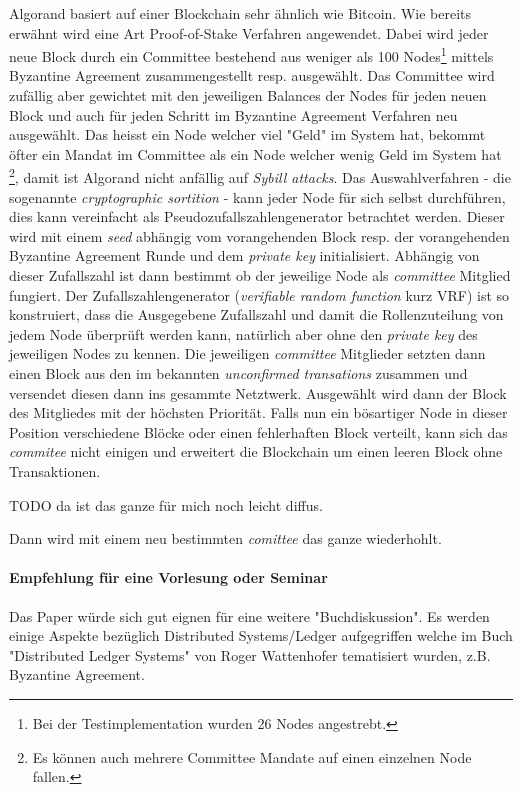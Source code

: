 \documentclass[11pt,a4paper]{article}
\begin{document}
Algorand basiert auf einer Blockchain sehr ähnlich wie Bitcoin.
Wie bereits erw\"ahnt wird eine Art Proof-of-Stake Verfahren angewendet.
Dabei wird jeder neue Block durch ein Committee bestehend aus weniger als 100 Nodes\footnote{Bei der Testimplementation wurden 26 Nodes angestrebt.} mittels Byzantine Agreement zusammengestellt resp. ausgewählt.
Das Committee wird zufällig aber gewichtet mit den jeweiligen Balances der Nodes für jeden neuen Block und auch für jeden Schritt im Byzantine Agreement Verfahren neu ausgew\"ahlt.
Das heisst ein Node welcher viel "Geld" im System hat, bekommt \"ofter ein Mandat im Committee als ein Node welcher wenig Geld im System hat \footnote{Es k\"onnen auch mehrere Committee Mandate auf einen einzelnen Node fallen.}, damit ist Algorand nicht anf\"allig auf \textit{Sybill attacks}.
Das Auswahlverfahren - die sogenannte \textit{cryptographic sortition} - kann jeder Node für sich selbst durchführen, dies kann vereinfacht als Pseudozufallszahlengenerator betrachtet werden.
Dieser wird mit einem \textit{seed} abhängig vom vorangehenden Block resp. der vorangehenden Byzantine Agreement Runde und dem \textit{private key} initialisiert.
Abh\"angig von dieser Zufallszahl ist dann bestimmt ob der jeweilige Node als \textit{committee} Mitglied fungiert.
Der Zufallszahlengenerator (\textit{verifiable random function} kurz VRF) ist so konstruiert,
dass die Ausgegebene Zufallszahl und damit die Rollenzuteilung von jedem Node \"uberpr\"uft werden kann,
nat\"urlich aber ohne den \textit{private key} des jeweiligen Nodes zu kennen.
Die jeweiligen \textit{committee} Mitglieder setzten dann einen Block aus den im bekannten \textit{unconfirmed transations} zusammen und versendet diesen dann ins gesammte Netztwerk.
Ausgewählt wird dann der Block des Mitgliedes mit der höchsten Priorität.
Falls nun ein b\"osartiger Node in dieser Position verschiedene Bl\"ocke oder einen fehlerhaften Block
verteilt, kann sich das \textit{commitee} nicht einigen und erweitert die Blockchain um einen leeren Block ohne Transaktionen.

TODO da ist das ganze für mich noch leicht diffus.

Dann wird mit einem neu bestimmten \textit{comittee} das ganze wiederhohlt.

\paragraph*{Empfehlung f\"ur eine Vorlesung oder Seminar}
Das Paper \cite{Gilad:2017:ASB:3132747.3132757} w\"urde sich gut eignen f\"ur eine weitere "Buchdiskussion".
Es werden einige Aspekte bez\"uglich Distributed Systems/Ledger aufgegriffen welche 
im Buch "Distributed Ledger Systems" von Roger Wattenhofer tematisiert wurden, z.B. Byzantine Agreement.
\end{document}
